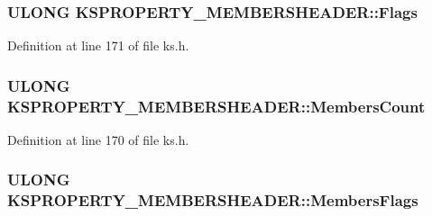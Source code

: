 \subsubsection[{\texorpdfstring{Flags}{Flags}}]{\setlength{\rightskip}{0pt plus 5cm}U\+L\+O\+NG K\+S\+P\+R\+O\+P\+E\+R\+T\+Y\+\_\+\+M\+E\+M\+B\+E\+R\+S\+H\+E\+A\+D\+E\+R\+::\+Flags}\hypertarget{struct_k_s_p_r_o_p_e_r_t_y___m_e_m_b_e_r_s_h_e_a_d_e_r_a9e37e2476cef657b377d427668ebe30f}{}\label{struct_k_s_p_r_o_p_e_r_t_y___m_e_m_b_e_r_s_h_e_a_d_e_r_a9e37e2476cef657b377d427668ebe30f}


Definition at line 171 of file ks.\+h.

\subsubsection[{\texorpdfstring{Members\+Count}{MembersCount}}]{\setlength{\rightskip}{0pt plus 5cm}U\+L\+O\+NG K\+S\+P\+R\+O\+P\+E\+R\+T\+Y\+\_\+\+M\+E\+M\+B\+E\+R\+S\+H\+E\+A\+D\+E\+R\+::\+Members\+Count}\hypertarget{struct_k_s_p_r_o_p_e_r_t_y___m_e_m_b_e_r_s_h_e_a_d_e_r_a9d28d105427e281243c4819a94f8a450}{}\label{struct_k_s_p_r_o_p_e_r_t_y___m_e_m_b_e_r_s_h_e_a_d_e_r_a9d28d105427e281243c4819a94f8a450}


Definition at line 170 of file ks.\+h.

\subsubsection[{\texorpdfstring{Members\+Flags}{MembersFlags}}]{\setlength{\rightskip}{0pt plus 5cm}U\+L\+O\+NG K\+S\+P\+R\+O\+P\+E\+R\+T\+Y\+\_\+\+M\+E\+M\+B\+E\+R\+S\+H\+E\+A\+D\+E\+R\+::\+Members\+Flags}\hypertarget{struct_k_s_p_r_o_p_e_r_t_y___m_e_m_b_e_r_s_h_e_a_d_e_r_a7ce4c541d1e347aad8c19d241f1ef890}{}\label{struct_k_s_p_r_o_p_e_r_t_y___m_e_m_b_e_r_s_h_e_a_d_e_r_a7ce4c541d1e347aad8c19d241f1ef890}



